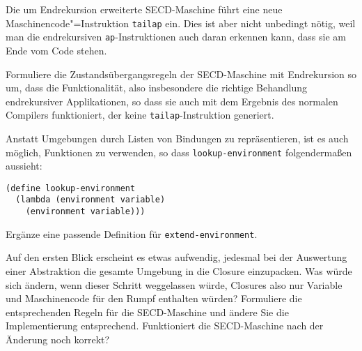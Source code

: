 \begin{aufgabe}
  Die um Endrekursion erweiterte SECD-Maschine führt eine neue
  Maschinencode"=Instruktion \lstinline{tailap} ein.  Dies ist aber nicht
  unbedingt nötig, weil man die endrekursiven
  \lstinline{ap}-Instruktionen auch daran erkennen kann, dass sie am
  Ende vom Code stehen.

  Formuliere die Zustandsübergangsregeln der
  SECD-Maschine mit Endrekursion so um, dass die Funktionalität, also
  insbesondere die richtige Behandlung endrekursiver Applikationen, so
  dass sie auch mit dem Ergebnis des normalen Compilers funktioniert,
  der keine \lstinline{tailap}-Instruktion generiert.
  \end{aufgabe}

\begin{aufgabe}
  Anstatt Umgebungen durch Listen von Bindungen zu repräsentieren, ist
  es auch möglich, Funktionen zu verwenden, so dass
  \lstinline{lookup-environment} folgendermaßen aussieht:
\begin{lstlisting}
(define lookup-environment
  (lambda (environment variable)
    (environment variable)))
\end{lstlisting}
  Ergänze eine passende Definition für
  \lstinline{extend-environment}.
\end{aufgabe}

\begin{aufgabe}
  Auf den ersten Blick erscheint es etwas aufwendig, jedesmal bei der
  Auswertung einer Abstraktion die gesamte Umgebung in die Closure
  einzupacken.  Was würde sich ändern, wenn dieser Schritt weggelassen
  würde, Closures also nur Variable und Maschinencode für den Rumpf
  enthalten würden?  Formuliere die entsprechenden Regeln für die
  SECD-Maschine und ändere Sie die Implementierung entsprechend.
  Funktioniert die SECD-Maschine nach der Änderung noch korrekt?
\end{aufgabe}


